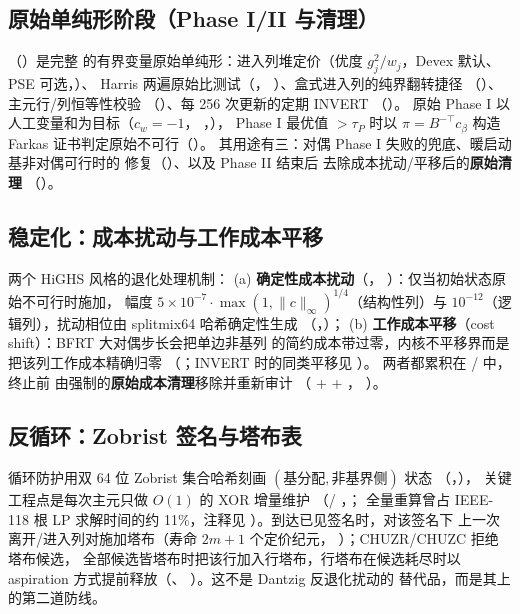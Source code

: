 \documentclass[11pt]{ctexart}
\begin{document}
\subsection{原始单纯形阶段（Phase I/II 与清理）}
（）是完整
的有界变量原始单纯形：进入列堆定价（优度 $g_j^2/w_j$，Devex 默认、
PSE 可选，）、
Harris 两遍原始比测试（，
）、盒式进入列的纯界翻转捷径
（）、主元行/列恒等性校验
（）、每 256 次更新的定期 INVERT
（）。
原始 Phase I 以人工变量和为目标（$c_w = -1$，
，），
Phase I 最优值 $> \tau_P$ 时以 $\pi = B^{-\top}c_\beta$ 构造 Farkas
证书判定原始不可行（）。
其用途有三：对偶 Phase I 失败的兜底、暖启动基非对偶可行时的
修复（）、以及 Phase II 结束后
去除成本扰动/平移后的\textbf{原始清理}
（）。

\subsection{稳定化：成本扰动与工作成本平移}
两个 HiGHS 风格的退化处理机制：
(a) \textbf{确定性成本扰动}（，
）：仅当初始状态原始不可行时施加，
幅度 $5\times10^{-7}\cdot\max(1,\|c\|_\infty)^{1/4}$（结构性列）与
$10^{-12}$（逻辑列），扰动相位由 splitmix64 哈希确定性生成
（，）；
(b) \textbf{工作成本平移}（cost shift）：BFRT 大对偶步长会把单边非基列
的简约成本带过零，内核不平移界而是把该列工作成本精确归零
（；INVERT 时的同类平移见
）。
两者都累积在 / 中，终止前
由强制的\textbf{原始成本清理}移除并重新审计
（ +  + ，
）。

\subsection{反循环：Zobrist 签名与塔布表}
循环防护用双 64 位 Zobrist 集合哈希刻画
$(\text{基分配}, \text{非基界侧})$ 状态
（，），
关键工程点是每次主元只做 $O(1)$ 的 XOR 增量维护
（/
，；
全量重算曾占 IEEE-118 根 LP 求解时间的约 11\%，注释见
）。到达已见签名时，对该签名下
上一次离开/进入列对施加塔布（寿命 $2m+1$ 个定价纪元，
）；CHUZR/CHUZC 拒绝塔布候选，
全部候选皆塔布时把该行加入行塔布，行塔布在候选耗尽时以
aspiration 方式提前释放（、
）。这不是 Dantzig 反退化扰动的
替代品，而是其上的第二道防线。
\end{document}
